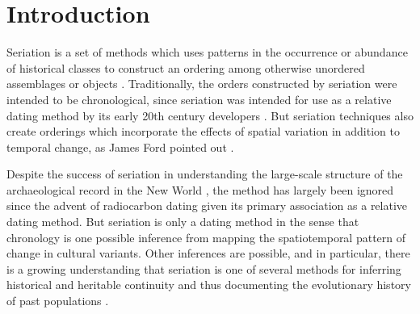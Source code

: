 \documentclass[graybox,natbib]{svmult}
\begin{document}



\section{Introduction}\label{introduction}

Seriation is a set of methods which uses patterns in the occurrence or
abundance of historical classes to construct an ordering among otherwise
unordered assemblages or objects \citep{Dunnell:1970aa}. Traditionally,
the orders constructed by seriation were intended to be chronological,
since seriation was intended for use as a relative dating method by its
early 20th century developers
\citep{o2000applying, o1998james, Lyman:2006aa, OBrien1999b, lyman1997rise}.
But seriation techniques also create orderings which incorporate the
effects of spatial variation in addition to temporal change, as James
Ford pointed out \citep{Ford:1938aa, Phillips1951, Ford:1935aa}.

Despite the success of seriation in understanding the large-scale
structure of the archaeological record in the New World
\citep{Beals1945, Bluhm1951, Evans1955, Ford1949, Kidder1917, Mayer-Oakes1955, Meggers1957, Phillips1951, Rouse1939, Smith1950},
the method has largely been ignored since the advent of radiocarbon
dating given its primary association as a relative dating method. But
seriation is only a dating method in the sense that chronology is one
possible inference from mapping the spatiotemporal pattern of change in
cultural variants. Other inferences are possible, and in particular,
there is a growing understanding that seriation is one of several
methods for inferring historical and heritable continuity and thus
documenting the evolutionary history of past populations
\citep[e.g.,][Ch. 3]{OBrien1999b}.
\end{document}
